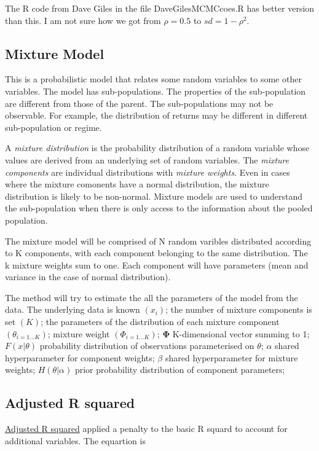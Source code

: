 \documentclass[12pt, a4paper, oneside]{article}\usepackage[]{graphicx}\usepackage[]{color}
\begin{document}
The R code from Dave Giles in the file DaveGilesMCMCcoes.R has better version than this. I am not sure how we got from $\rho = 0.5$ to $sd = 1-\rho^2$. 

\subsection{Mixture Model}
This is a probabilistic model that relates some random variables to some other variables.  The model has sub-populations. The properties of the sub-population are different from those of the parent. The sub-populations may not be observable.  For example, the distribution of returns may be different in different sub-population or regime. 

A \emph{mixture distribution} is the probability distribution of a random variable  whose values are derived from an underlying set of random variables. The \emph{mixture components} are individual distributions with \emph{mixture weights}.  Even in cases where the mixture comonents have a normal distribution, the mixture distribution is likely to be non-normal. Mixture models are used to understand the sub-population when there is only access to the information about the pooled population. 

The mixture model will be comprised of N random varibles distributed according to K components, with each component belonging to the same distribution. The k mixture weights sum to one. Each component will have parameters (mean and variance in the case of normal distribution).  

The method will try to estimate the all the parameters of the model from the data.  The underlying data is known $(x_i)$; the number of mixture components is set $(K)$; the parameters of the distribution of each mixture component $(\theta_{i=1\dots K})$; mixture weight $(\Phi_{i = 1\dots K})$; $\mathbf{\Phi}$ K-dimensional vector summing to 1; $F(x|\theta)$ probability distribution of observations parameterised on $\theta$; $\alpha$ shared hyperparameter for component weights; $\beta$ shared hyperparameter for mixture weights; $H(\theta|\alpha)$ prior probability distribution of component parameters; 

\subsection{Adjusted R squared}
\href{http://davegiles.blogspot.ca/2013/05/when-will-adjusted-r-squared-increase.html}{Adjusted R squared} applied a penalty to the basic R squard to account for additional variables.  The equartion is 
\end{document}
